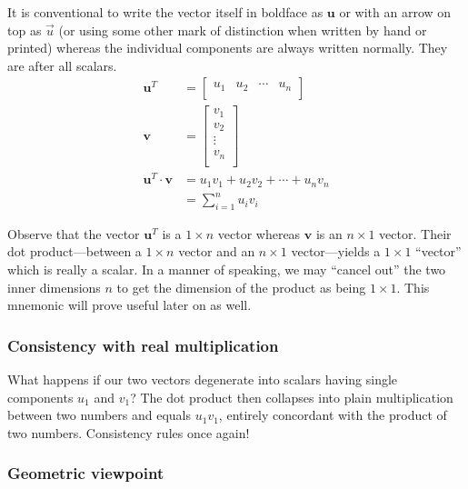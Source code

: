 \documentclass[
  a4paper,
]{article}
\begin{document}
It is conventional to write the vector itself in boldface as
\(\symbf{u}\) or with an arrow on top as \(\vec{u}\) (or using some
other mark of distinction when written by hand or printed) whereas the
individual components are always written normally. They are after all
scalars. \[
\begin{aligned}
\symbf{u}^{T} &= \begin{bmatrix}u_{1} & u_{2} &  \cdots & u_{n}\\\end{bmatrix}\\
\symbf{v} &= \begin{bmatrix}v_{1} \\ v_{2} \\ \vdots \\ v_{n}\\\end{bmatrix}\\
\symbf{u}^{T}\cdot\symbf{v} &= u_{1}v_{1} + u_{2}v_{2} + \cdots + u_{n}v_{n}\\
&= \sum_{i=1}^{n} u_{i}v_{i}
\end{aligned}
\]

Observe that the vector \(\symbf{u}^{T}\) is a \(1 \times n\) vector
whereas \(\symbf{v}\) is an \(n \times 1\) vector. Their dot
product---between a \(1 \times n\) vector and an \(n \times 1\)
vector---yields a \(1 \times 1\) ``vector'' which is really a scalar. In
a manner of speaking, we may ``cancel out'' the two inner dimensions
\(n\) to get the dimension of the product as being \(1 \times 1\). This
mnemonic will prove useful later on as well.

\hypertarget{consistency-with-real-multiplication}{%
\subsubsection{Consistency with real
multiplication}\label{consistency-with-real-multiplication}}

What happens if our two vectors degenerate into scalars having single
components \(u_{1}\) and \(v_{1}\)? The dot product then collapses into
plain multiplication between two numbers and equals \(u_{1}v_{1}\),
entirely concordant with the product of two numbers. Consistency rules
once again!

\hypertarget{geometric-viewpoint}{%
\subsubsection{Geometric viewpoint}\label{geometric-viewpoint}}
\end{document}
